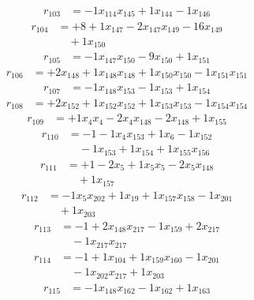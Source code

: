\[\begin{aligned}
r_{103} &= - 1 x_{114} x_{145} + 1 x_{144} - 1 x_{146}
\end{aligned}\]
\[\begin{aligned}
r_{104} &= + 8 + 1 x_{147} - 2 x_{147} x_{149} - 16 x_{149} \\
 &\quad + 1 x_{150}
\end{aligned}\]
\[\begin{aligned}
r_{105} &= - 1 x_{147} x_{150} - 9 x_{150} + 1 x_{151}
\end{aligned}\]
\[\begin{aligned}
r_{106} &= + 2 x_{148} + 1 x_{148} x_{148} + 1 x_{150} x_{150} - 1 x_{151} x_{151}
\end{aligned}\]
\[\begin{aligned}
r_{107} &= - 1 x_{148} x_{153} - 1 x_{153} + 1 x_{154}
\end{aligned}\]
\[\begin{aligned}
r_{108} &= + 2 x_{152} + 1 x_{152} x_{152} + 1 x_{153} x_{153} - 1 x_{154} x_{154}
\end{aligned}\]
\[\begin{aligned}
r_{109} &= + 1 x_{4} x_{4} - 2 x_{4} x_{148} - 2 x_{148} + 1 x_{155}
\end{aligned}\]
\[\begin{aligned}
r_{110} &= - 1 - 1 x_{4} x_{153} + 1 x_{6} - 1 x_{152} \\
 &\quad - 1 x_{153} + 1 x_{154} + 1 x_{155} x_{156}
\end{aligned}\]
\[\begin{aligned}
r_{111} &= + 1 - 2 x_{5} + 1 x_{5} x_{5} - 2 x_{5} x_{148} \\
 &\quad + 1 x_{157}
\end{aligned}\]
\[\begin{aligned}
r_{112} &= - 1 x_{5} x_{202} + 1 x_{19} + 1 x_{157} x_{158} - 1 x_{201} \\
 &\quad + 1 x_{203}
\end{aligned}\]
\[\begin{aligned}
r_{113} &= - 1 + 2 x_{148} x_{217} - 1 x_{159} + 2 x_{217} \\
 &\quad - 1 x_{217} x_{217}
\end{aligned}\]
\[\begin{aligned}
r_{114} &= - 1 + 1 x_{104} + 1 x_{159} x_{160} - 1 x_{201} \\
 &\quad - 1 x_{202} x_{217} + 1 x_{203}
\end{aligned}\]
\[\begin{aligned}
r_{115} &= - 1 x_{148} x_{162} - 1 x_{162} + 1 x_{163}
\end{aligned}\]
